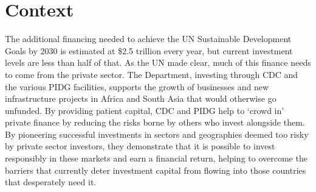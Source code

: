 \section{Context}

The additional financing needed to achieve the UN Sustainable Development Goals by 2030 is estimated at \$2.5 trillion every year, but current investment levels are less than half of that. %
As the UN made clear, much of this finance needs to come from the  private sector. The Department, investing through CDC and the various PIDG facilities, supports the growth of businesses and new infrastructure projects in Africa and South Asia that would otherwise go unfunded. %
By providing patient capital, CDC and PIDG help to `crowd in' private finance by reducing the risks borne by others who invest alongside them. %
By pioneering successful investments in sectors and geographies deemed too risky by private sector investors, they demonstrate that it is possible to invest responsibly in these markets and earn a financial return, helping to overcome the barriers that currently deter investment capital from flowing into those countries that desperately need it. %

\newpage
